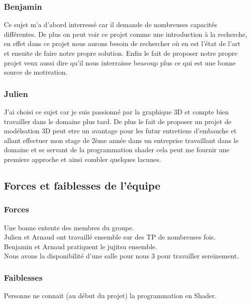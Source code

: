 \documentclass[a4paper,10pt]{article}
\begin{document}
\subsubsection{Benjamin}
        Ce sujet m'a d'abord interressé car il demande de nombreuses capacités différentes. De plus on peut voir ce projet comme une introduction à la recherche, en effet dans ce projet nous aurons besoin de rechercher où en est l'état de l'art et ensuite de faire notre propre solution. Enfin le fait de proposer notre propre projet veux aussi dire qu'il nous interraisse beacoup plus ce qui est une bonne source de motivation.\\
\subsubsection{Julien}
     J'ai choisi ce sujet car je suis passionné par la graphique 3D et compte bien travailler dans le domaine plus tard. De plus le fait de proposer un projet de modélsation 3D peut etre un avantage pour les futur entretiens d'embauche et allant effectuer mon stage de 2ème année dans un entreprise travaillant dans le domaine et se servant de la programmation shader cela peut me fournir une premiere approche et ainsi combler quelques lacunes.\\


\subsection{Forces et faiblesses de l'équipe}
\subsubsection{Forces}
Une bonne entente des membres du groupe.\\
Julien et Arnaud ont travaillé ensemble sur des TP de nombreuses fois.\\
Benjamin et Arnaud pratiquent le jujitsu ensemble.\\
Nous avons la disponibilité d'une salle pour nous 3 pour travailler sereinement.\\

\subsubsection{Faiblesses}
Personne ne connait (au début du projet) la programmation en Shader.\\
\end{document}
